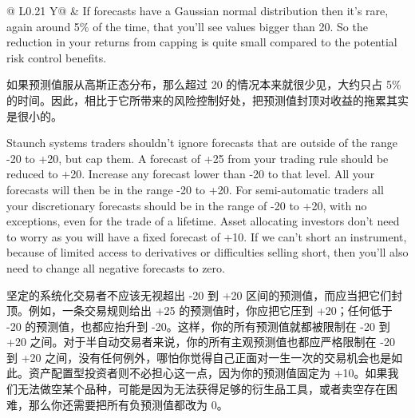 \begin{bilingualtableblock}
\begin{breakabletabularx}{\textwidth}{@{} L{0.21\textwidth} Y@{}}
\midrule
{} & If forecasts have a Gaussian normal distribution then it's rare, again around 5\% of the time, that you'll see values bigger than 20. So the reduction in your returns from capping is quite small compared to the potential risk control benefits.\par\medskip 如果预测值服从高斯正态分布，那么超过 20 的情况本来就很少见，大约只占 5\% 的时间。因此，相比于它所带来的风险控制好处，把预测值封顶对收益的拖累其实是很小的。 \\
\end{breakabletabularx}
\endgroup
\end{bilingualtableblock}

\bipairgap

\begin{englishblock} Staunch systems traders shouldn't ignore forecasts that are outside of the range -20 to +20, but cap them. A forecast of +25 from your trading rule should be reduced to +20. Increase any forecast lower than -20 to that level. All your forecasts will then be in the range -20 to +20. For semi-automatic traders all your discretionary forecasts should be in the range of -20 to +20, with no exceptions, even for the trade of a lifetime. Asset allocating investors don't need to worry as you will have a fixed forecast of +10. If we can't short an instrument, because of limited access to derivatives or difficulties selling short, then you'll also need to change all negative forecasts to zero. \end{englishblock}

\begin{chineseblock}坚定的系统化交易者不应该无视超出 -20 到 +20 区间的预测值，而应当把它们封顶。例如，一条交易规则给出 +25 的预测值时，你应把它压到 +20；任何低于 -20 的预测值，也都应抬升到 -20。这样，你的所有预测值就都被限制在 -20 到 +20 之间。对于半自动交易者来说，你的所有主观预测值也都应严格限制在 -20 到 +20 之间，没有任何例外，哪怕你觉得自己正面对一生一次的交易机会也是如此。资产配置型投资者则不必担心这一点，因为你的预测值固定为 +10。如果我们无法做空某个品种，可能是因为无法获得足够的衍生品工具，或者卖空存在困难，那么你还需要把所有负预测值都改为 0。 \end{chineseblock}



